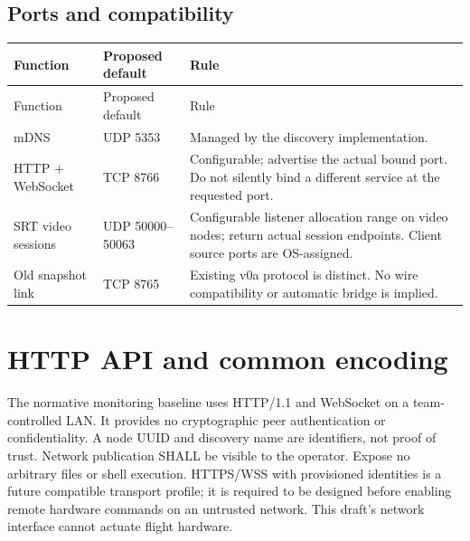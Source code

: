 \subsection{Ports and compatibility}
\begin{longtable}{L{35mm}L{34mm}L{92mm}}
\toprule Function & Proposed default & Rule\\\midrule
\endfirsthead
\toprule Function & Proposed default & Rule\\\midrule
\endhead
mDNS & UDP 5353 & Managed by the discovery implementation.\\
HTTP + WebSocket & TCP 8766 & Configurable; advertise the actual bound port. Do not silently bind a different service at the requested port.\\
SRT video sessions & UDP 50000--50063 & Configurable listener allocation range on video nodes; return actual session endpoints. Client source ports are OS-assigned.\\
Old snapshot link & TCP 8765 & Existing v0a protocol is distinct. No wire compatibility or automatic bridge is implied.\\
\bottomrule
\end{longtable}


\section{HTTP API and common encoding}\label{sec:http}
The normative monitoring baseline uses HTTP/1.1 and WebSocket on a team-controlled
LAN. It provides no cryptographic peer authentication or confidentiality. A node
UUID and discovery name are identifiers, not proof of trust. Network publication
SHALL be visible to the operator. Expose no arbitrary files or shell execution.
HTTPS/WSS with provisioned identities is a future compatible transport profile;
it is required to be designed before enabling remote hardware commands on an
untrusted network. This draft's network interface cannot actuate flight hardware.

